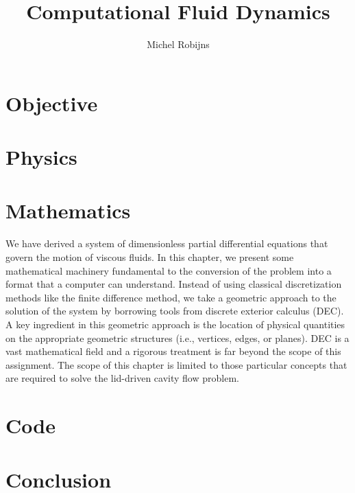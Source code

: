 \documentclass[a4paper,10pt]{scrreprt}
\begin{document}
\title{Computational Fluid Dynamics}
\author{Michel Robijns}

\maketitle

\tableofcontents

\chapter{Objective}



\chapter{Physics}
\label{cha:physics}



\chapter{Mathematics}
\label{cha:mathematics}

We have derived a system of dimensionless partial differential equations that govern the motion of viscous fluids. In this chapter, we present some mathematical machinery fundamental to the conversion of the problem into a format that a computer can understand. Instead of using classical discretization methods like the finite difference method, we take a geometric approach to the solution of the system by borrowing tools from discrete exterior calculus (DEC). A key ingredient in this geometric approach is the location of physical quantities on the appropriate geometric structures (i.e., vertices, edges, or planes). DEC is a vast mathematical field and a rigorous treatment is far beyond the scope of this assignment. The scope of this chapter is limited to those particular concepts that are required to solve the lid-driven cavity flow problem.









\chapter{Code}

\chapter{Conclusion}
\end{document}
